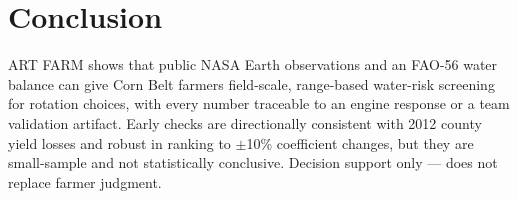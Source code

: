 \documentclass[10pt,twocolumn]{article}
\begin{document}
\section{Conclusion}
ART FARM shows that public NASA Earth observations and an FAO-56 water balance can give Corn Belt farmers field-scale, range-based water-risk screening for rotation choices, with every number traceable to an engine response or a team validation artifact. Early checks are directionally consistent with 2012 county yield losses and robust in ranking to $\pm$10\% coefficient changes, but they are small-sample and not statistically conclusive. Decision support only --- does not replace farmer judgment.

\small


\end{document}
